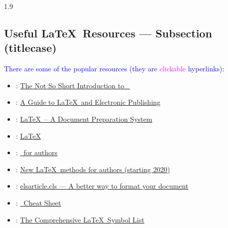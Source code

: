 \documentclass[phd]{ndsu-thesis-2022}
\newcommand\myspacing{1.9} %
\newcommand\italk[1]{\textcolor{blue}{#1}}  %
\begin{document}
\begin{spacing}{\myspacing}
\subsection{Useful \LaTeX\ Resources --- Subsection (titlecase)} 

\italk{There are some of the popular resources (they are \textcolor{magenta}{clickable} hyperlinks):}

\begin{itemize}
\setlength\itemindent{0.25in}
\item \citet{notso2021}:  \textcolor{magenta}{\href{http://tug.ctan.org/info/lshort/english/lshort.pdf}
{The Not So Short Introduction to \LaTeXe\ }}

\item \citet{kopka2004guide}:  \textcolor{magenta}{\href{https://www.math.ucdavis.edu/~tracy/courses/math129/Guide_To_LaTeX.pdf}
{A Guide to \LaTeX\ and Electronic Publishing}}

\item \citet{lamport94}: \textcolor{magenta}{\href{https://www.pearson.com/us/higher-education/program/Lamport-La-Te-X-A-Document-Preparation-System-2nd-Edition/PGM159713.html}
{\LaTeX\ -- A Document Preparation System}}

\item \citet{Wikibook2016}: \textcolor{magenta}{\href{http://upload.wikimedia.org/wikipedia/commons/2/2d/LaTeX.pdf}
{LaTeX}}

\item \citet{latxprojteam20}: \textcolor{magenta}{\href{https://www.latex-project.org/help/documentation/usrguide.pdf}
{\LaTeXe\ for authors}}

\item \citet{latxprojteam22}: \textcolor{magenta}{\href{https://www.latex-project.org/help/documentation/usrguide3.pdf}
{New \LaTeX\ methods for authors (starting 2020)}}

\item \citet{elsevier2020}: \textcolor{magenta}{\href{https://www.elsevier.com/authors/policies-and-guidelines/documents/elsdoc-1.pdf}
{elsarticle.cls --- A better way to format your document}}

\item \citet{Chang2014cheat}: \textcolor{magenta}{\href{https://wch.github.io/latexsheet/latexsheet.pdf}
{\LaTeXe\ Cheat Sheet}}

\item \citet{pakin2021comp}: \textcolor{magenta}{\href{https://tug.ctan.org/info/symbols/comprehensive/symbols-a4.pdf}
{The Comprehensive \LaTeX\ Symbol List}}
\end{itemize}


\end{spacing}
\end{document}
